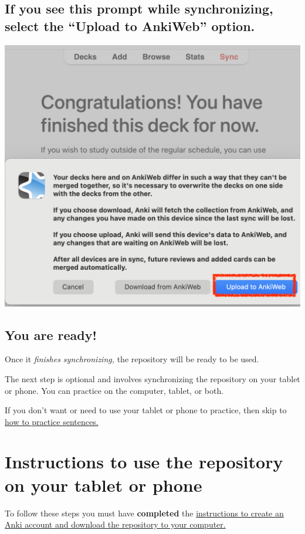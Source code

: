 \documentclass[
]{book}
\begin{document}
\hypertarget{if-you-see-this-prompt-while-synchronizing-select-the-upload-to-ankiweb-option.}{%
\section*{If you see this prompt while synchronizing, select the ``Upload to AnkiWeb'' option.}\label{if-you-see-this-prompt-while-synchronizing-select-the-upload-to-ankiweb-option.}}

\includegraphics[width=0.6\linewidth]{images/reposit_en/subir_a_anki}

\hypertarget{you-are-ready}{%
\section{You are ready!}\label{you-are-ready}}

Once it \emph{finishes synchronizing,} the repository will be ready to be used.

The next step is optional and involves synchronizing the repository on your tablet or phone. You can practice on the computer, tablet, or both.

If you don't want or need to use your tablet or phone to practice, then skip to \protect\hyperlink{cross_5}{how to practice sentences.}

\hypertarget{instructions-to-use-the-repository-on-your-tablet-or-phone}{%
\chapter{Instructions to use the repository on your tablet or phone}\label{instructions-to-use-the-repository-on-your-tablet-or-phone}}

To follow these steps you must have \textbf{completed} the \protect\hyperlink{cross_3}{instructions to create an Anki account and download the repository to your computer.}
\end{document}
